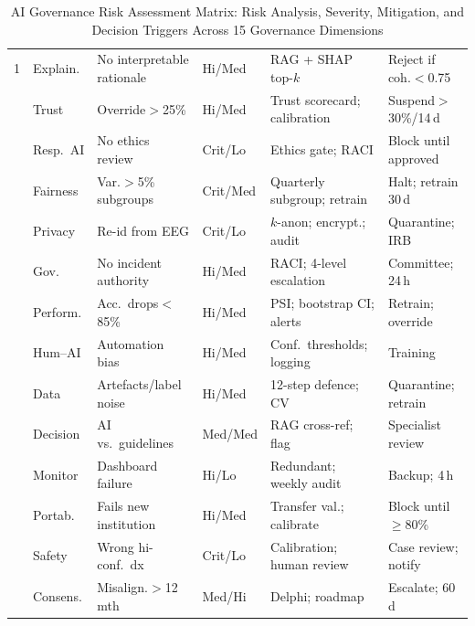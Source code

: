 \begin{table}[!htbp]
\tablestripes
\tablefontsize
\caption[AI Governance Risk Assessment Matrix]{AI Governance Risk Assessment Matrix: Risk Analysis, Severity, Mitigation, and Decision Triggers Across 15 Governance Dimensions}
\begin{tabularx}{\textwidth}{@{} p{0.3cm} >{\raggedright\arraybackslash}p{1.5cm} L >{\raggedright\arraybackslash}p{1.1cm} L L @{}}
\toprule
\thead{\#} &  &  &  &  &  \\
 & Explain. & No interpretable rationale & Hi/Med & RAG + SHAP top-$k$ & Reject if coh.$<$0.75 \\
 & Trust & Override$>$25\% & Hi/Med & Trust scorecard; calibration & Suspend$>$30\%/14\,d \\
 & Resp.\ AI & No ethics review & Crit/Lo & Ethics gate; RACI & Block until approved \\
 & Fairness & Var.$>$5\% subgroups & Crit/Med & Quarterly subgroup; retrain & Halt; retrain 30\,d \\
 & Privacy & Re-id from EEG & Crit/Lo & $k$-anon; encrypt.; audit & Quarantine; IRB \\
 & Gov. & No incident authority & Hi/Med & RACI; 4-level escalation & Committee; 24\,h \\
 & Perform. & Acc.\ drops$<$85\% & Hi/Med & PSI; bootstrap CI; alerts & Retrain; override \\
 & Hum--AI & Automation bias & Hi/Med & Conf.\ thresholds; logging & Training \\
 & Data & Artefacts/label noise & Hi/Med & 12-step defence; CV & Quarantine; retrain \\
 & Decision & AI vs.\ guidelines & Med/Med & RAG cross-ref; flag & Specialist review \\
 & Monitor & Dashboard failure & Hi/Lo & Redundant; weekly audit & Backup; 4\,h \\
 & Portab. & Fails new institution & Hi/Med & Transfer val.; calibrate & Block until$\geq$80\% \\
 & Safety & Wrong hi-conf.\ dx & Crit/Lo & Calibration; human review & Case review; notify \\
 & Consens. & Misalign.$>$12\,mth & Med/Hi & Delphi; roadmap & Escalate; 60\,d \\

\end{tabularx}
\end{table}
